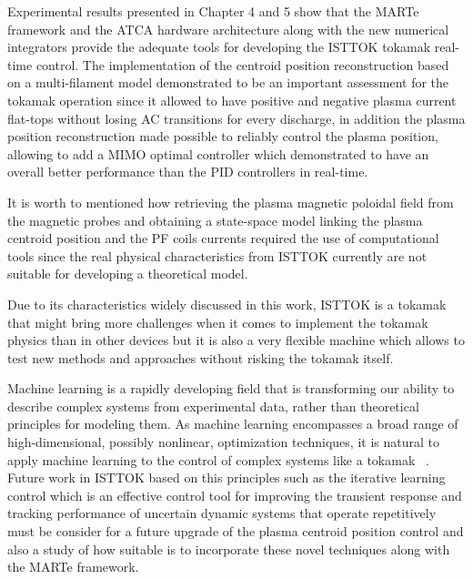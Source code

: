 Experimental results presented in Chapter 4 and 5 show that the MARTe framework and the ATCA hardware architecture along with the new numerical integrators provide the adequate tools for developing the ISTTOK tokamak real-time control. The implementation of the centroid position reconstruction based on a multi-filament model demonstrated to be an important assessment for the tokamak operation since  it allowed to have  positive and negative plasma current flat-tops without losing AC transitions for every discharge, in addition the plasma position reconstruction made  possible to reliably control the plasma position, allowing to add a MIMO optimal controller which demonstrated to have an overall better performance than the PID controllers in real-time. \smallskip


It is worth to mentioned how retrieving the plasma magnetic poloidal field from the magnetic probes and obtaining a state-space model linking the plasma centroid position and the PF coils currents required the use of computational tools since the real physical characteristics from ISTTOK currently are not suitable for developing a theoretical model.\smallskip

Due to its characteristics widely discussed in this work, ISTTOK is a tokamak that might bring  more challenges when it comes to implement the tokamak physics than in other devices but it is also a very flexible machine which allows to test new methods and approaches without risking the tokamak itself.\smallskip

Machine learning is a rapidly developing field that is transforming our ability to describe complex systems from experimental data, rather than theoretical principles for modeling them. As machine learning encompasses a broad range of high-dimensional, possibly nonlinear, optimization techniques, it is natural to apply machine learning to the control of complex systems like a tokamak ~\cite[Chapter~10]{DataDriven2019}. Future work in ISTTOK based on this principles such as the iterative learning control which is an effective control tool for improving the transient response and tracking performance of uncertain dynamic systems that operate repetitively~\cite{Ahn2007}  must be consider for a future upgrade of the plasma centroid position control and also a study of how suitable is to incorporate these novel techniques along with the MARTe framework.
